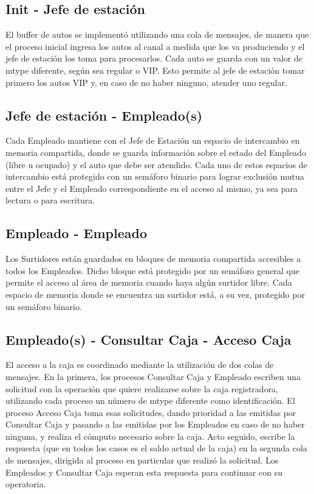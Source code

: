 \documentclass{article}
\begin{document}
\subsection{Init - Jefe de estación}
El buffer de autos se implementó utilizando una cola de mensajes, de manera que el proceso inicial ingresa los autos al canal a medida que los va produciendo y el jefe de estación los toma para procesarlos.
Cada auto se guarda con un valor de mtype diferente, según sea regular o VIP. Esto permite al jefe de estación tomar primero los autos VIP y, en caso de no haber ninguno, atender uno regular.
\subsection{Jefe de estación - Empleado(s)}
Cada Empleado mantiene con el Jefe de Estación un espacio de intercambio en memoria compartida, donde se guarda información sobre el estado del Empleado (libre u ocupado) y el auto que debe ser atendido. Cada uno de estos espacios de intercambio está protegido con un semáforo binario para lograr exclusión mutua entre el Jefe y el Empleado correspondiente en el acceso al mismo, ya sea para lectura o para escritura.
\subsection{Empleado - Empleado}
Los Surtidores están guardados en bloques de memoria compartida accesibles a todos los Empleados. Dicho bloque está protegido por un semáforo general que permite el acceso al área de memoria cuando haya algún surtidor libre. Cada espacio de memoria donde se encuentra un surtidor está, a su vez, protegido por un semáforo binario.
\subsection{Empleado(s) - Consultar Caja - Acceso Caja}
El acceso a la caja es coordinado mediante la utilización de dos colas de mensajes. En la primera, los procesos Consultar Caja y Empleado escriben una solicitud con la operación que quiere realizarse sobre la caja registradora, utilizando cada proceso un número de mtype diferente como identificación.
El proceso Acceso Caja toma esas solicitudes, dando prioridad a las emitidas por Consultar Caja y pasando a las emitidas por los Empleados en caso de no haber ninguna, y realiza el cómputo necesario sobre la caja.
Acto seguido, escribe la respuesta (que en todos los casos es el saldo actual de la caja) en la segunda cola de mensajes, dirigida al proceso en particular que realizó la solicitud.
Los Empleados y Consultar Caja esperan esta respuesta para continuar con su operatoria.
\end{document}
